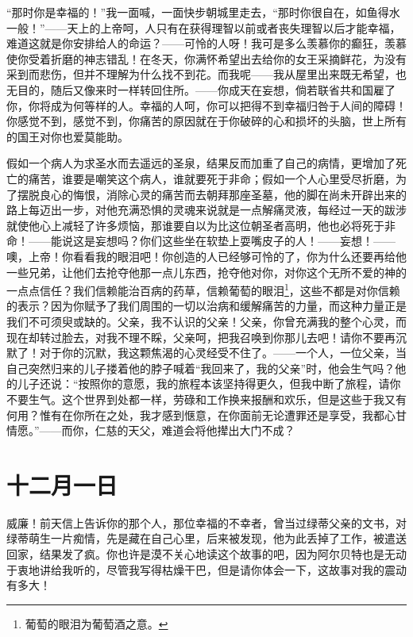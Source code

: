 \documentclass[12pt,oneside]{book}
\begin{document}
“那时你是幸福的！”我一面喊，一面快步朝城里走去，“那时你很自在，如鱼得水一般！”——天上的上帝呵，人只有在获得理智以前或者丧失理智以后才能幸福，难道这就是你安排给人的命运？——可怜的人呀！我可是多么羡慕你的癫狂，羡慕使你受着折磨的神志错乱！在冬天，你满怀希望出去给你的女王采摘鲜花，为没有采到而悲伤，但并不理解为什么找不到花。而我呢——我从屋里出来既无希望，也无目的，随后又像来时一样转回住所。——你成天在妄想，倘若联省共和国雇了你，你将成为何等样的人。幸福的人呵，你可以把得不到幸福归咎于人间的障碍！你感觉不到，感觉不到，你痛苦的原因就在于你破碎的心和损坏的头脑，世上所有的国王对你也爱莫能助。

假如一个病人为求圣水而去遥远的圣泉，结果反而加重了自己的病情，更增加了死亡的痛苦，谁要是嘲笑这个病人，谁就要死于非命；假如一个人心里受尽折磨，为了摆脱良心的悔恨，消除心灵的痛苦而去朝拜那座圣墓，他的脚在尚未开辟出来的路上每迈出一步，对他充满恐惧的灵魂来说就是一点解痛灵液，每经过一天的跋涉就使他心上减轻了许多烦恼，那谁要自以为比这位朝圣者高明，他也必将死于非命！——能说这是妄想吗？你们这些坐在软垫上耍嘴皮子的人！——妄想！——噢，上帝！你看看我的眼泪吧！你创造的人已经够可怜的了，你为什么还要再给他一些兄弟，让他们去抢夺他那一点儿东西，抢夺他对你，对你这个无所不爱的神的一点点信任？我们信赖能治百病的药草，信赖葡萄的眼泪\footnote{葡萄的眼泪为葡萄酒之意。}，这些不都是对你信赖的表示？因为你赋予了我们周围的一切以治病和缓解痛苦的力量，而这种力量正是我们不可须臾或缺的。父亲，我不认识的父亲！父亲，你曾充满我的整个心灵，而现在却转过脸去，对我不理不睬，父亲呵，把我召唤到你那儿去吧！请你不要再沉默了！对于你的沉默，我这颗焦渴的心灵经受不住了。——一个人，一位父亲，当自己突然归来的儿子搂着他的脖子喊着“我回来了，我的父亲”时，他会生气吗？他的儿子还说：“按照你的意愿，我的旅程本该坚持得更久，但我中断了旅程，请你不要生气。这个世界到处都一样，劳碌和工作换来报酬和欢乐，但是这些于我又有何用？惟有在你所在之处，我才感到惬意，在你面前无论遭罪还是享受，我都心甘情愿。”——而你，仁慈的天父，难道会将他撵出大门不成？
　　

\chapter{十二月一日}
威廉！前天信上告诉你的那个人，那位幸福的不幸者，曾当过绿蒂父亲的文书，对绿蒂萌生一片痴情，先是藏在自己心里，后来被发现，他为此丢掉了工作，被遣送回家，结果发了疯。你也许是漠不关心地读这个故事的吧，因为阿尔贝特也是无动于衷地讲给我听的，尽管我写得枯燥干巴，但是请你体会一下，这故事对我的震动有多大！
　　
\end{document}
